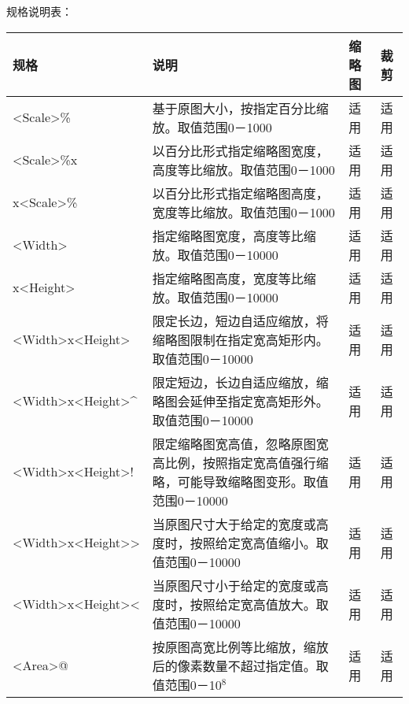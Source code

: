 \documentclass[11pt, oneside]{book}
\newcommand{\qpar}[1]{
\vspace{0.25em}
\noindent
#1\par
\vspace{0.25em}
}
\newcommand{\qtable}[1]{\footnotesize\vspace{0.5em}#1\vspace{0.5em}\normalsize}
\begin{document}
\begin{CJK*}{UTF8}{song}
\qpar{规格说明表：}
\qtable{
\begin{tabular}[t]{|l|p{20em}|p{3em}|p{3em}|}
\hline
规格 & 说明 & 缩略图 & 裁剪 \\
\hline
\textless Scale\textgreater\% & 基于原图大小，按指定百分比缩放。取值范围0－1000 & 适用 & 适用 \\
\hline
\textless Scale\textgreater\%x & 以百分比形式指定缩略图宽度，高度等比缩放。取值范围0－1000 & 适用 & 适用 \\
\hline
x\textless Scale\textgreater\% & 以百分比形式指定缩略图高度，宽度等比缩放。取值范围0－1000 & 适用 & 适用 \\
\hline
\textless Width\textgreater & 指定缩略图宽度，高度等比缩放。取值范围0－10000 & 适用 & 适用 \\
\hline
x\textless Height\textgreater & 指定缩略图高度，宽度等比缩放。取值范围0－10000 & 适用 & 适用 \\
\hline
\textless Width\textgreater x\textless Height\textgreater & 限定长边，短边自适应缩放，将缩略图限制在指定宽高矩形内。取值范围0－10000 & 适用 & 适用 \\
\hline
\textless Width\textgreater x\textless Height\textgreater \^ & 限定短边，长边自适应缩放，缩略图会延伸至指定宽高矩形外。取值范围0－10000 & 适用 & 适用 \\
\hline
\textless Width\textgreater x\textless Height\textgreater ! & 限定缩略图宽高值，忽略原图宽高比例，按照指定宽高值强行缩略，可能导致缩略图变形。取值范围0－10000 & 适用 & 适用 \\
\hline
\textless Width\textgreater x\textless Height\textgreater \textgreater & 当原图尺寸大于给定的宽度或高度时，按照给定宽高值缩小。取值范围0－10000 & 适用 & 适用 \\
\hline
\textless Width\textgreater x\textless Height\textgreater \textless & 当原图尺寸小于给定的宽度或高度时，按照给定宽高值放大。取值范围0－10000 & 适用 & 适用 \\
\hline
\textless Area\textgreater @ & 按原图高宽比例等比缩放，缩放后的像素数量不超过指定值。取值范围0－10$^8$ & 适用 & 适用 \\
\hline
\end{tabular}
}

\end{CJK*}
\end{document}
